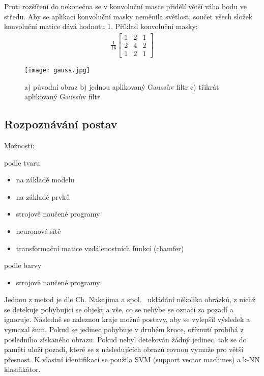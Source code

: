 Proti rozšíření do nekonečna se v konvoluční masce přidělí větší váha bodu ve středu. Aby se aplikací konvoluční masky neměnila světlost, součet všech složek konvoluční matice dává hodnotu 1. Příklad konvoluční masky:
\begin{eqnarray}
\frac{1}{16} \begin{bmatrix}
1 & 2 & 1 \\
2 & 4 & 2 \\
1 & 2 & 1
\end{bmatrix}
\end{eqnarray} 

\begin{figure}[h]
\centering
\texttt{[image: gauss.jpg]}
\caption{a) původní obraz b) jednou aplikovaný Gaussův filtr c) třikrát aplikovaný Gaussův filtr~\cite{15} }
\end{figure}




\subsection{Rozpoznávání postav}
Možnosti:

podle tvaru
\begin{itemize}
\item na základě modelu
\item na základě prvků

\item strojově naučené programy
\item neuronové sítě %
\item transformační matice vzdálenostních funkcí (chamfer)
\end{itemize}

podle barvy
\begin{itemize}
\item strojově naučené programy\\
\end{itemize}


Jednou z metod je dle Ch. Nakajima a spol.~\cite{6} ukládání několika obrázků, z nichž se detekuje pohybující se objekt a vše, co se nehýbe se označí za pozadí a ignoruje. Následně se naleznou kraje možné postavy, aby se vylepšil výsledek a vymazal šum. Pokud se jedinec pohybuje v druhém kroce, oříznutí probíhá z posledního získaného obrazu. Pokud nebyl detekován žádný jedinec, tak se do paměti uloží pozadí, které se z následujících obrazů rovnou vymaže pro větší přesnost. K vlastní identifikaci se použila SVM (support vector machines) a k-NN klasifikátor.\\

